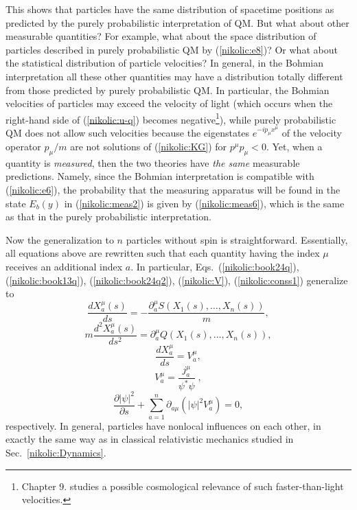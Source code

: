 \documentclass[12pt,twoside]{report} %
\begin{document}
This shows that particles have the same distribution of spacetime positions as
predicted by the purely probabilistic interpretation of QM. 
But what about other measurable quantities? For example,
what about the space distribution of particles described in purely probabilistic QM by (\ref{nikolic:e8})?
Or what about the statistical distribution of particle velocities? In general, 
in the Bohmian interpretation all these other quantities may have a distribution totally
different from those predicted by purely probabilistic QM. In particular, the Bohmian velocities
of particles may exceed the velocity of light (which occurs when the right-hand side of 
(\ref{nikolic:u-q}) becomes negative\footnote{Chapter 9. studies
a possible cosmological relevance of such faster-than-light velocities.}), 
while purely probabilistic QM does not allow such velocities
because the eigenstates $e^{-ip_{\mu}x^{\mu}}$ of the velocity operator
$\hat{p}_{\mu}/m$ are not solutions of (\ref{nikolic:KG}) for $p^{\mu}p_{\mu}<0$.
Yet, when a quantity is {\em measured}, then the two theories have {\em the same} 
measurable predictions. 
Namely, since the Bohmian interpretation is compatible with (\ref{nikolic:e6}), the probability
that the measuring apparatus will be found in the state $E_b(y)$ in (\ref{nikolic:meas2})
is given by (\ref{nikolic:meas6}), which is the same as that in the purely probabilistic interpretation.

Now the generalization to $n$ particles without spin is straightforward. Essentially, 
all equations above are rewritten such that each quantity having the index $\mu$ receives
an additional index $a$. In particular, Eqs.~(\ref{nikolic:book24q}), (\ref{nikolic:book13q}), (\ref{nikolic:book24q2}), 
(\ref{nikolic:V}), (\ref{nikolic:conss1})
generalize to
\begin{equation}\label{nikolic:book24qn}
 \frac{dX_a^{\mu}(s)}{ds}=-\frac{\partial_a^{\mu}S(X_1(s),\ldots,X_n(s))}{m} ,
\end{equation}
\begin{equation}\label{nikolic:book13qn}
 m\frac{d^2X_a^{\mu}(s)}{ds^2}=\partial_a^{\mu}Q(X_1(s),\ldots,X_n(s)) ,
\end{equation}
\begin{equation}\label{nikolic:book24q2n}
 \frac{dX_a^{\mu}}{ds}=V_a^{\mu} ,
\end{equation}
\begin{equation}\label{nikolic:Vn}
V_a^{\mu}=\frac{j_a^{\mu}}{\psi^*\psi} \; ,
\end{equation}
 \begin{equation}\label{nikolic:conss1n}
\frac{\partial|\psi|^2}{\partial s} + 
\sum_{a=1}^{n}\partial_{a\mu}(|\psi|^2 V_a^{\mu})=0 ,
\end{equation}
respectively.
In general, particles have nonlocal influences on each other, in exactly the same way
as in classical relativistic mechanics studied in Sec.~\ref{nikolic:Dynamics}.
\end{document}
